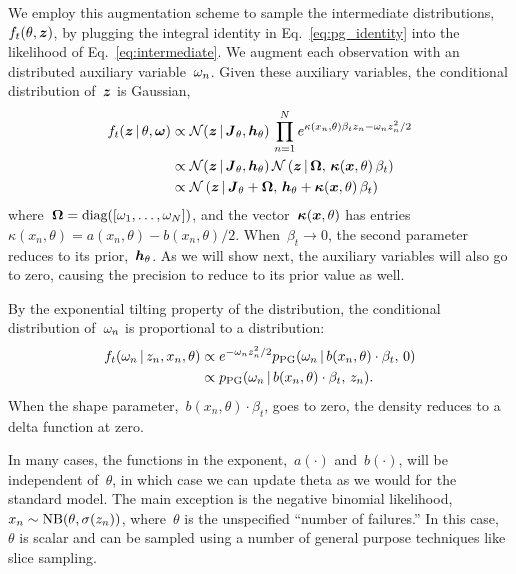 We employ this augmentation scheme to sample the intermediate
distributions,~$f_t(\theta, \boldsymbol{z})$, by plugging the
integral identity in Eq.~\ref{eq:pg_identity} into the likelihood
of Eq.~\ref{eq:intermediate}. We augment each observation
with an \polyagamma distributed auxiliary variable~${\omega}_n$.
Given these auxiliary variables, the conditional distribution of~$\boldsymbol{z}$ is Gaussian,
\begin{align}
  \label{eq:f_t}
  f_t(\boldsymbol{z} \,|\, \theta, {\boldsymbol{{\omega}}}) &\propto \mathcal{N}(\boldsymbol{z} \,|\, \boldsymbol{J}_\theta, \boldsymbol{h}_\theta) \,
  \prod_{n=1}^N e^{\kappa(x_n, \theta) \beta_t z_n - {\omega}_n z_n^2 /2} \\
  &\propto \mathcal{N}(\boldsymbol{z} \,|\, \boldsymbol{J}_\theta, \boldsymbol{h}_\theta) \,
  \mathcal{N} \left(\boldsymbol{z} \,|\, {\boldsymbol{{\Omega}}}, \, \boldsymbol{\kappa}(\boldsymbol{x}, \theta) \,\beta_t \right) \\
  &\propto \mathcal{N} \left(\boldsymbol{z} \,|\, \boldsymbol{J}_\theta + {\boldsymbol{{\Omega}}},\,
  \boldsymbol{h}_\theta + \boldsymbol{\kappa}(\boldsymbol{x}, \theta) \,\beta_t \right)
\end{align}
where~${{\boldsymbol{{\Omega}}} = \text{diag}([{\omega}_1, \ldots, {\omega}_N])}$, and
the vector~${\boldsymbol{\kappa}(\boldsymbol{x}, \theta)}$ has entries~
${\kappa(x_n, \theta) = a(x_n, \theta) - b(x_n, \theta)/2}$.
When~${\beta_t \to 0}$, the second parameter reduces to its prior,~$\boldsymbol{h}_\theta$.
As we will show next, the auxiliary variables will also go
to zero, causing the precision to reduce to its prior value as well.

By the exponential tilting property of the \polyagamma
distribution, the conditional distribution of~${\omega}_n$
is proportional to a \polyagamma distribution:
\begin{align*}
  \nonumber
  f_t({\omega}_n \,|\, z_n, x_n, \theta) &
  \propto e^{-{\omega}_n z_n^2/2}
  p_{\mathrm{PG}}({\omega}_n \,|\, b(x_n, \theta) \cdot \beta_t, \, 0) \\
  &\propto p_{\mathrm{PG}}({\omega}_n \,|\, b(x_n, \theta) \cdot \beta_t, \, z_n).
\end{align*}
When the shape parameter,~$b(x_n, \theta) \cdot \beta_t$, goes to zero, the
\polyagamma density reduces to a delta function at zero. 

In many cases, the functions in the exponent,~$a(\cdot)$ and~$b(\cdot)$,
will be independent of~$\theta$, in which case we can update theta
as we would for the standard model. The main exception is the
negative binomial likelihood,~$x_n \sim \mathrm{NB}(\theta, \sigma(z_n))$,
where~$\theta$ is the unspecified ``number of failures.''
In this case,~$\theta$ is scalar and can be sampled using a number
of general purpose techniques like slice sampling.

